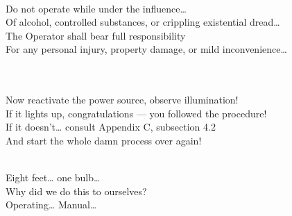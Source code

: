 \begin{lyrics}
\\
Do not operate while under the influence…\\
Of alcohol, controlled substances, or crippling existential dread…\\
The Operator shall bear full responsibility\\
For any personal injury, property damage, or mild inconvenience…

\\
\\
Now reactivate the power source, observe illumination!\\
If it lights up, congratulations — you followed the procedure!\\
If it doesn’t… consult Appendix C, subsection 4.2\\
And start the whole damn process over again!

\\
Eight feet… one bulb…\\
Why did we do this to ourselves?\\
Operating… Manual…

\end{lyrics}

